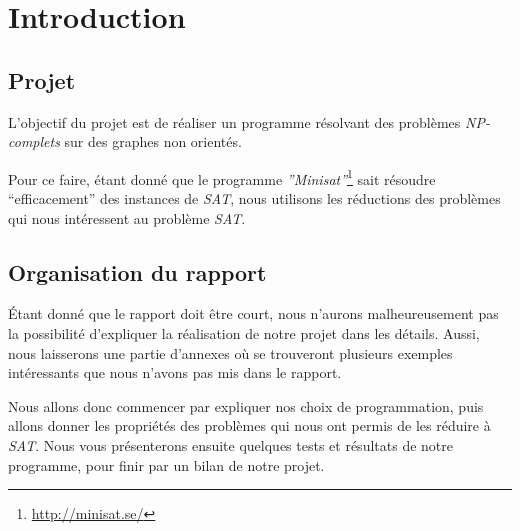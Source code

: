  \section{Introduction}

  \subsection{Projet}
  L'objectif du projet est de réaliser un programme résolvant des
  problèmes \emph{NP-complets} sur des graphes non orientés.

  Pour ce faire, étant donné que le programme
  \emph{''Minisat''}\footnote{\url{http://minisat.se/}} sait résoudre
  ``efficacement'' des instances de \emph{SAT}, nous utilisons les
  réductions des problèmes qui nous intéressent au problème \emph{SAT}.

  \subsection{Organisation du rapport}
  Étant donné que le rapport doit être court, nous n'aurons
  malheureusement pas la possibilité d'expliquer la réalisation de notre 
  projet dans les détails. Aussi, nous laisserons une partie d'annexes
  où se trouveront plusieurs exemples intéressants que nous n'avons pas
  mis dans le rapport.

  Nous allons donc commencer par expliquer nos choix de programmation,
  puis allons donner les propriétés des problèmes qui nous ont permis de
  les réduire à \emph{SAT}. Nous vous présenterons ensuite quelques
  tests et résultats de notre programme, pour finir par un bilan de
  notre projet.